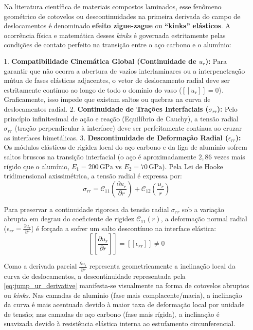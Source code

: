 Na literatura científica de materiais compostos laminados, esse fenômeno geométrico de cotovelos ou descontinuidades na primeira derivada do campo de deslocamentos é denominado \textbf{efeito zigue-zague} ou \textbf{``kinks'' elásticos}. A ocorrência física e matemática desses \textit{kinks} é governada estritamente pelas condições de contato perfeito na transição entre o aço carbono e o alumínio:

1. \textbf{Compatibilidade Cinemática Global (Continuidade de $u_r$):} Para garantir que não ocorra a abertura de vazios interlaminares ou a interpenetração mútua de fases elásticas adjacentes, o vetor de deslocamento radial deve ser estritamente contínuo ao longo de todo o domínio do vaso ($[[u_r]] = 0$). Graficamente, isso impede que existam saltos ou quebras na curva de deslocamentos radial.
2. \textbf{Continuidade de Trações Interfaciais ($\sigma_{rr}$):} Pelo princípio infinitesimal de ação e reação (Equilíbrio de Cauchy), a tensão radial $\sigma_{rr}$ (tração perpendicular à interface) deve ser perfeitamente contínua ao cruzar as interfaces bimetálicas.
3. \textbf{Descontinuidade de Deformação Radial ($\epsilon_{rr}$):} Os módulos elásticos de rigidez local do aço carbono e da liga de alumínio sofrem saltos bruscos na transição interfacial (o aço é aproximadamente $2,86$ vezes mais rígido que o alumínio, $E_1 = 200 \, \text{GPa}$ vs $E_2 = 70 \, \text{GPa}$). Pela Lei de Hooke tridimensional axissimétrica, a tensão radial é expressa por:
\begin{equation}
  \sigma_{rr} = \mathcal{C}_{11} \left(\frac{\partial u_r}{\partial r}\right) + \mathcal{C}_{12} \left(\frac{u_r}{r}\right)
  \label{eq:hooke_srr_kinks}
\end{equation}

Para preservar a continuidade rigorosa da tensão radial $\sigma_{rr}$ sob a variação abrupta em degrau do coeficiente de rigidez $\mathcal{C}_{11}(r)$, a deformação normal radial ($\epsilon_{rr} = \frac{\partial u_r}{\partial r}$) é forçada a sofrer um salto descontínuo na interface elástica:
\begin{equation}
  \left[\left[ \frac{\partial u_r}{\partial r} \right]\right] = \left[\left[ \epsilon_{rr} \right]\right] \neq 0
  \label{eq:jump_ur_derivative}
\end{equation}

Como a derivada parcial $\frac{\partial u_r}{\partial r}$ representa geometricamente a inclinação local da curva de deslocamentos, a descontinuidade representada pela \eqref{eq:jump_ur_derivative} manifesta-se visualmente na forma de cotovelos abruptos ou \textit{kinks}. Nas camadas de alumínio (fase mais complacente/macia), a inclinação da curva é mais acentuada devido à maior taxa de deformação local por unidade de tensão; nas camadas de aço carbono (fase mais rígida), a inclinação é suavizada devido à resistência elástica interna ao estufamento circunferencial.

